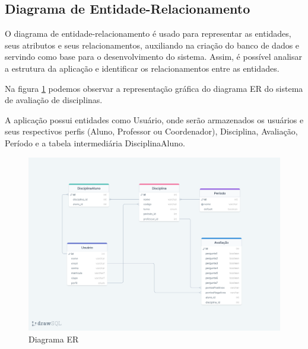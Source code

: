 \subsection{Diagrama de Entidade-Relacionamento}

O diagrama de entidade-relacionamento é usado para representar as entidades, seus atributos e seus relacionamentos, auxiliando na criação do banco de dados e servindo como base para o desenvolvimento do sistema. Assim, é possível analisar a estrutura da aplicação e identificar os relacionamentos entre as entidades.

Na figura \ref{fig:fig_diagrama_er} podemos observar a representação gráfica do diagrama ER do sistema de avaliação de disciplinas.

A aplicação possui entidades como Usuário, onde serão armazenados os usuários e seus respectivos perfis (Aluno, Professor ou Coordenador), Disciplina, Avaliação, Período e a tabela intermediária DisciplinaAluno. 

\begin{figure}[h]
  \centering
  \includegraphics[width=1\textwidth]{imagens/diagrama-er.png}
  \caption{Diagrama ER}
  \label{fig:fig_diagrama_er}
\end{figure}





%

